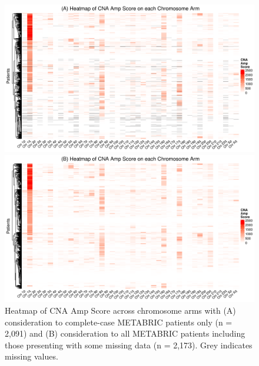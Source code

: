 \vfill
\begin{figure}[!h]
  \centering
   \vspace{0.4cm}
  \includegraphics[width = 1.05\textwidth]{../figures/Chapter_2/CNA_Amp_Score_Heatmap_CCA.png}
  
  \vspace{1.3cm}
  
    \includegraphics[width = 1.05\textwidth]{../figures/Chapter_2/CNA_Amp_Score_Heatmap_All.png}
  
   \vspace{0.4cm}
 
  \caption[Heatmap of CNA Amp Score across chromosome arms.]{Heatmap of CNA Amp Score across chromosome arms with (A) consideration to complete-case METABRIC patients only (n = 2,091) and (B) consideration to all METABRIC patients including those presenting with some missing data (n = 2,173). Grey indicates missing values.}
  \label{SurvTrees_Score_HM_CCA}
\end{figure}
\vfill 
\clearpage

